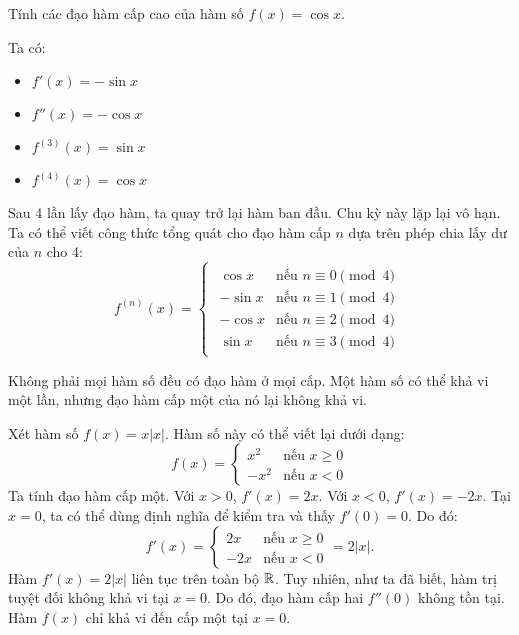 \begin{example}
    Tính các đạo hàm cấp cao của hàm số $f(x) = \cos x$.
    \begin{solution}
        Ta có:
        \begin{itemize}
            \item $f'(x) = -\sin x$
            \item $f''(x) = -\cos x$
            \item $f^{(3)}(x) = \sin x$
            \item $f^{(4)}(x) = \cos x$
        \end{itemize}
        Sau 4 lần lấy đạo hàm, ta quay trở lại hàm ban đầu. Chu kỳ này lặp lại vô hạn. Ta có thể viết công thức tổng quát cho đạo hàm cấp $n$ dựa trên phép chia lấy dư của $n$ cho 4:
        \[
        f^{(n)}(x) =
        \begin{cases}
            \begin{array}{rl}
                \cos x  & \text{nếu } n \equiv 0 \pmod{4} \\
                -\sin x & \text{nếu } n \equiv 1 \pmod{4} \\
                -\cos x & \text{nếu } n \equiv 2 \pmod{4} \\
                \sin x  & \text{nếu } n \equiv 3 \pmod{4}
            \end{array}
        \end{cases}
        \]

    \end{solution}
\end{example}

\begin{importantbox}
    Không phải mọi hàm số đều có đạo hàm ở mọi cấp. Một hàm số có thể khả vi một lần, nhưng đạo hàm cấp một của nó lại không khả vi.
\end{importantbox}

\begin{example}
    Xét hàm số $f(x) = x|x|$. Hàm số này có thể viết lại dưới dạng:
    \[ f(x) = \begin{cases}
        x^2 & \text{nếu } x \ge 0 \\
        -x^2 & \text{nếu } x < 0
    \end{cases} \]
    Ta tính đạo hàm cấp một. Với $x > 0$, $f'(x) = 2x$. Với $x < 0$, $f'(x) = -2x$. Tại $x=0$, ta có thể dùng định nghĩa để kiểm tra và thấy $f'(0)=0$. Do đó:
    \[ f'(x) = \begin{cases}
        2x & \text{nếu } x \ge 0 \\
        -2x & \text{nếu } x < 0
    \end{cases} = 2|x|. \]
    Hàm $f'(x) = 2|x|$ liên tục trên toàn bộ $\mathbb{R}$. Tuy nhiên, như ta đã biết, hàm trị tuyệt đối không khả vi tại $x=0$. Do đó, đạo hàm cấp hai $f''(0)$ không tồn tại. Hàm $f(x)$ chỉ khả vi đến cấp một tại $x=0$.
\end{example}

